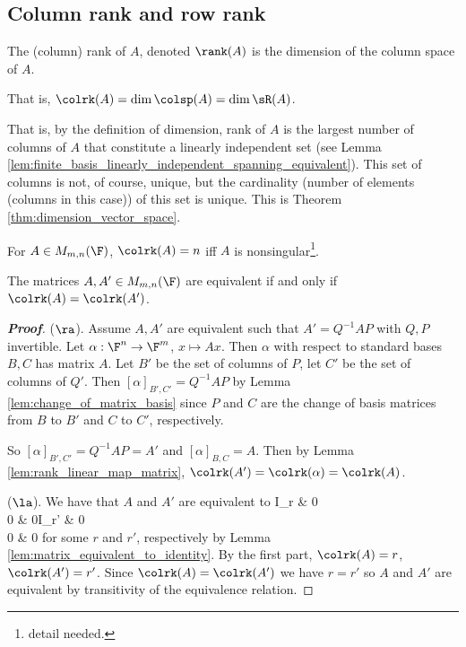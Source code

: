 \subsection{Column rank and row rank}



\begin{definition}\label{def:column_rank_matrix}
The (column) rank of $A$, denoted $\rank(A)$ is the dimension of the column space of $A$. %

That is, $\colrk(A) = \dim\colsp(A)=\dim\sR(A)$.
\end{definition}

\begin{remark}
That is, by the definition of dimension, rank of $A$ is the largest number of columns of $A$ that constitute a linearly independent set (see Lemma \ref{lem:finite_basis_linearly_independent_spanning_equivalent}). This set of columns is not, of course, unique, but the cardinality (number of elements (columns in this case)) of this set is unique. This is Theorem \ref{thm:dimension_vector_space}.

For $A\in M_{m,n}(\F)$, $\colrk(A) = n$ iff $A$ is nonsingular\footnote{detail needed.}.
\end{remark}

\begin{proposition}\label{pro:equivalent_rank}
The matrices $A,A'\in M_{m,n}(\F)$ are equivalent if and only if $\colrk(A) = \colrk(A')$.
\end{proposition}

\begin{proof}[\bf Proof]
($\ra$). Assume $A,A'$ are equivalent such that $A' = Q^{-1}AP$ with $Q, P$ invertible. Let $\alpha : \F^n \to \F^m$, $x \mapsto Ax$. Then $\alpha$ with respect to standard bases $B,C$ has matrix $A$. Let $B'$ be the set of columns of $P$, let $C'$ be the set of columns of $Q'$. Then $[\alpha]_{B',C'} = Q^{-1}AP$ by Lemma \ref{lem:change_of_matrix_basis} since $P$ and $C$ are the change of basis matrices from $B$ to $B'$ and $C$ to $C'$, respectively.

So $[\alpha]_{B',C'} = Q^{-1}AP =A'$ and $[\alpha]_{B,C} = A$. Then by Lemma \ref{lem:rank_linear_map_matrix}, $\colrk(A') = \colrk(\alpha) = \colrk(A)$.

($\la$). We have that $A$ and $A'$ are equivalent to
\be
\bepm I_r & 0\\ 0 & 0\eepm\quad {}\quad \bepm I_{r'} & 0\\ 0 & 0\eepm
\ee
for some $r$ and $r'$, respectively by Lemma \ref{lem:matrix_equivalent_to_identity}. By the first part, $\colrk(A) = r$, $\colrk(A') = r'$. Since $\colrk(A) = \colrk(A')$ we have $r = r'$ so $A$ and $A'$ are equivalent by transitivity of the equivalence relation.
\end{proof}






